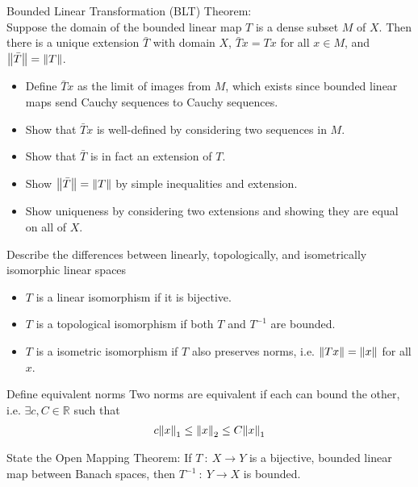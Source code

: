 \documentclass[avery5388,grid,frame]{flashcards}
\def\Rl{\mathbb{R}}
\begin{document}
\begin{flashcard}
    {Bounded Linear Transformation (BLT) Theorem:\\ Suppose the domain of the bounded linear map $T$ is a dense subset $M$ of $X$.  Then there is a unique extension $\bar{T}$ with domain $X$, $\bar{T}x = Tx$ for all $x \in M$, and $\norm{\bar{T}} = \norm{T}$.}
    \begin{itemize}
        \item Define $\bar{T}x$ as the limit of images from $M$, which exists since bounded linear maps send Cauchy sequences to Cauchy sequences.
        \item Show that $\bar{T}x$ is well-defined by considering two sequences in $M$.
        \item Show that $\bar{T}$ is in fact an extension of $T$.
        \item Show $\norm{\bar{T}} = \norm{T}$ by simple inequalities and extension.
        \item Show uniqueness by considering two extensions and showing they are equal on all of $X$.
    \end{itemize}
\end{flashcard}

\begin{flashcard}
    {Describe the differences between linearly, topologically, and isometrically isomorphic linear spaces}
    \begin{itemize}
        \item $T$ is a linear isomorphism if it is bijective.
        \item $T$ is a topological isomorphism if both $T$ and $T^{-1}$ are bounded.
        \item $T$ is a isometric isomorphism if $T$ also preserves norms, i.e. $\norm{Tx} = \norm{x}$ for all $x$.
    \end{itemize}
\end{flashcard}

\begin{flashcard}
    {Define equivalent norms}
    Two norms are equivalent if each can bound the other, i.e. $\exists c, C \in \Rl$ such that
    \begin{align*}
        c\norm{x}_1 \leq \norm{x}_2 \leq C\norm{x}_1
    \end{align*}
\end{flashcard}

\begin{flashcard}
    {State the Open Mapping Theorem:}
    If $T\ :\ X \rightarrow Y$ is a bijective, bounded linear map between Banach spaces, then $T^{-1}\ :\ Y \rightarrow X$ is bounded.
\end{flashcard}
\end{document}

